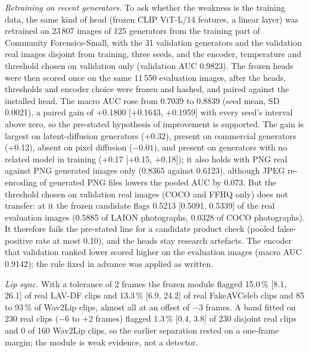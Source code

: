 \documentclass[conference,a4paper]{IEEEtran_nodash}
\begin{document}
\emph{Retraining on recent generators.} To ask whether the weakness is the
training data, the same kind of head (frozen CLIP ViT-L/14 features, a linear
layer) was retrained on 23\,807 images of 125 generators from the training part
of Community Forensics-Small, with the 31 validation generators and the
validation real images disjoint from training, three seeds, and the encoder,
temperature and threshold chosen on validation only (validation AUC 0.9823). The
frozen heads were then scored once on the same 11\,550 evaluation images, after
the heads, thresholds and encoder choice were frozen and hashed, and paired against
the installed head. The macro AUC rose from 0.7039 to 0.8839 (seed mean, SD
0.0021), a paired gain of +0.1800 [+0.1643, +0.1959] with every seed's interval
above zero, so the pre-stated hypothesis of improvement is supported. The gain is
largest on latent-diffusion generators (+0.32), present on commercial generators
(+0.12), absent on pixel diffusion ($-0.01$), and present on generators with no
related model in training (+0.17 [+0.15, +0.18]); it also holds with PNG real
against PNG generated images only (0.8365 against 0.6123), although JPEG
re-encoding of generated PNG files lowers the pooled AUC by 0.073. But the
threshold chosen on validation real images (COCO and FFHQ only) does not
transfer: at it the frozen candidate flags 0.5213 [0.5091, 0.5339] of the real
evaluation images (0.5885 of LAION photographs, 0.0328 of COCO photographs). It
therefore fails the pre-stated line for a candidate product check (pooled
false-positive rate at most 0.10), and the heads stay research artefacts. The
encoder that validation ranked lower scored higher on the evaluation images
(macro AUC 0.9142); the rule fixed in advance was applied as written.

\emph{Lip sync.} With a tolerance of 2 frames the frozen module flagged 15.0\,\%
[8.1, 26.1] of real LAV-DF clips and 13.3\,\% [6.9, 24.2] of real FakeAVCeleb clips
and 85 to 93\,\% of Wav2Lip clips, almost all at an offset of $-3$ frames. A band
fitted on 230 real clips ($-6$ to $+2$ frames) flagged 1.3\,\% [0.4, 3.8] of 230
disjoint real clips and 0 of 160 Wav2Lip clips, so the earlier separation rested
on a one-frame margin; the module is weak evidence, not a detector. %
\end{document}
